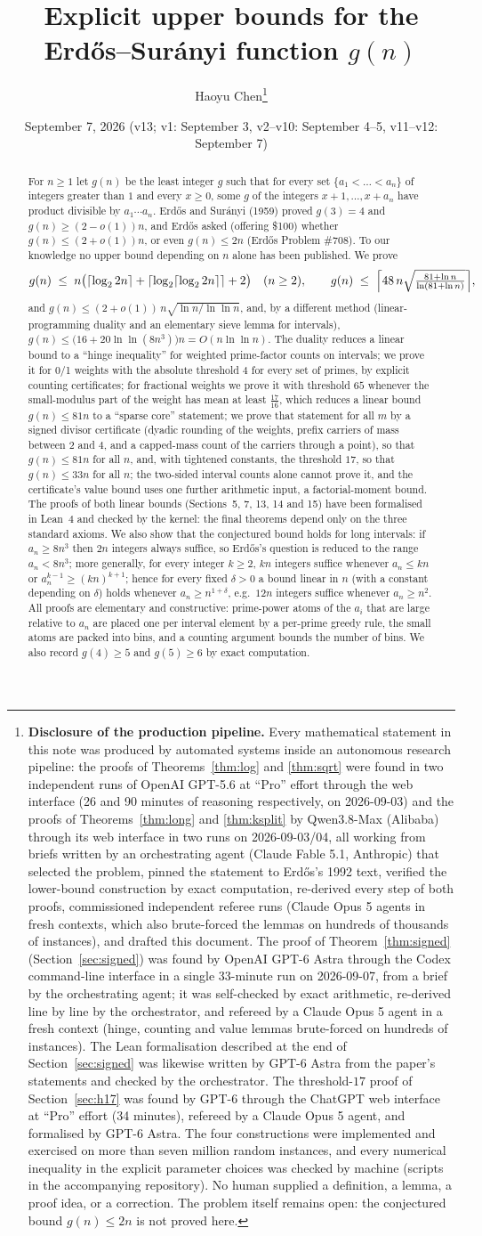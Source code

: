\documentclass[11pt]{article}
\title{Explicit upper bounds for the Erd\H{o}s--Sur\'anyi function $g(n)$}
\author{Haoyu Chen\thanks{%
\textbf{Disclosure of the production pipeline.} Every mathematical statement in this note was produced by
automated systems inside an autonomous research pipeline: the proofs of Theorems~\ref{thm:log} and \ref{thm:sqrt} were found in two independent runs
of OpenAI GPT-5.6 at ``Pro'' effort through the web interface (26 and 90 minutes of reasoning respectively,
on 2026-09-03) and the proofs of Theorems~\ref{thm:long} and \ref{thm:ksplit} by Qwen3.8-Max (Alibaba) through its web
interface in two runs on 2026-09-03/04, all working from briefs written by an orchestrating agent (Claude Fable 5.1, Anthropic) that
selected the problem, pinned the statement to Erd\H{o}s's 1992 text, verified the lower-bound construction
by exact computation, re-derived every step of both proofs, commissioned independent referee runs
(Claude Opus 5 agents in fresh contexts, which also brute-forced the lemmas on hundreds of thousands of
instances), and drafted this document. The proof of Theorem~\ref{thm:signed} (Section~\ref{sec:signed}) was found by OpenAI GPT-6 Astra
through the Codex command-line interface in a single 33-minute run on 2026-09-07, from a brief by the orchestrating agent; it was
self-checked by exact arithmetic, re-derived line by line by the orchestrator, and refereed by a Claude Opus 5 agent in a fresh context
(hinge, counting and value lemmas brute-forced on hundreds of instances). The Lean formalisation described at the end of
Section~\ref{sec:signed} was likewise written by GPT-6 Astra from the paper's statements and checked by the orchestrator. The threshold-$17$ proof of
Section~\ref{sec:h17} was found by GPT-6 through the ChatGPT web interface at ``Pro'' effort (34 minutes), refereed by a Claude Opus 5
agent, and formalised by GPT-6 Astra. The four constructions were implemented and exercised on more than
seven million random instances, and every numerical inequality in
the explicit parameter choices was checked by machine (scripts in the accompanying repository). No human
supplied a definition, a lemma, a proof idea, or a correction. The problem itself remains open: the
conjectured bound $g(n)\le 2n$ is not proved here.}}
\date{September 7, 2026 (v13; v1: September 3, v2--v10: September 4--5, v11--v12: September 7)}
\theoremstyle{definition}
\begin{document}
\maketitle

\begin{abstract}
For $n\ge 1$ let $g(n)$ be the least integer $g$ such that for every set $\{a_1<\dots<a_n\}$ of integers
greater than $1$ and every $x\ge 0$, some $g$ of the integers $x+1,\dots,x+a_n$ have product divisible by
$a_1\cdots a_n$. Erd\H{o}s and Sur\'anyi (1959) proved $g(3)=4$ and $g(n)\ge(2-o(1))n$, and Erd\H{o}s asked
(offering \$100) whether $g(n)\le(2+o(1))n$, or even $g(n)\le 2n$ (Erd\H{o}s Problem \#708). To our
knowledge no upper bound depending on $n$ alone has been published. We prove
\[
g(n)\;\le\; n\bigl(\lceil\log_2 2n\rceil+\lceil\log_2\lceil\log_2 2n\rceil\rceil+2\bigr)\quad(n\ge 2),
\qquad
g(n)\;\le\;\Bigl\lceil 48\,n\sqrt{\tfrac{81+\ln n}{\ln(81+\ln n)}}\Bigr\rceil ,
\]
and $g(n)\le(2+o(1))\,n\sqrt{\ln n/\ln\ln n}$, and, by a different method (linear-programming duality and an
elementary sieve lemma for intervals), $g(n)\le\bigl(16+20\ln\ln(8n^3)\bigr)n=O(n\ln\ln n)$. The duality reduces a linear bound to a ``hinge inequality'' for
weighted prime-factor counts on intervals; we prove it for 0/1 weights with the absolute threshold $4$ for every set of primes, by
explicit counting certificates; for fractional weights we prove it with threshold $65$ whenever the small-modulus part of the weight has
mean at least $\tfrac{17}{16}$, which reduces a linear bound $g(n)\le81n$ to a ``sparse core'' statement; we prove that statement for all $m$ by a signed divisor
certificate (dyadic rounding of the weights, prefix carriers of mass between $2$ and $4$, and a capped-mass count of the carriers through a
point), so that $g(n)\le81n$ for all $n$, and, with tightened constants, the threshold $17$, so that $g(n)\le33n$ for all $n$; the two-sided interval counts alone cannot prove it, and the certificate's value bound uses one
further arithmetic input, a factorial-moment bound. The proofs of both linear bounds (Sections~5, 7, 13, 14 and 15) have been formalised in
Lean~4 and checked by the kernel: the final theorems depend only on the three standard axioms. We also show that the conjectured bound holds for long
intervals: if $a_n\ge 8n^3$ then $2n$ integers always suffice, so Erd\H{o}s's question is reduced to the
range $a_n<8n^3$; more generally, for every integer $k\ge 2$, $kn$ integers suffice whenever $a_n\le kn$ or
$a_n^{k-1}\ge(kn)^{k+1}$; hence for every fixed $\delta>0$ a bound linear in $n$ (with a constant depending on
$\delta$) holds whenever $a_n\ge n^{1+\delta}$, e.g.\ $12n$ integers suffice whenever $a_n\ge n^2$. All proofs are elementary and constructive: prime-power atoms of the $a_i$ that are large
relative to $a_n$ are placed one per interval element by a per-prime greedy rule, the small atoms are packed
into bins, and a counting argument bounds the number of bins. We also record $g(4)\ge 5$ and $g(5)\ge 6$ by
exact computation.
\end{abstract}
\end{document}
